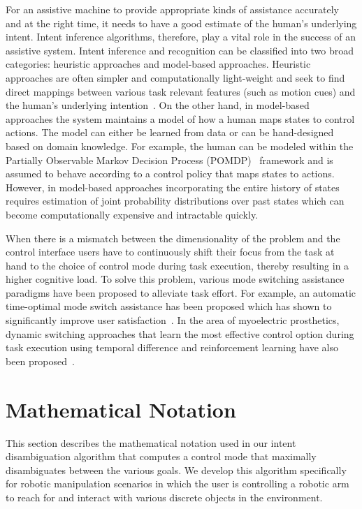 \documentclass[conference]{IEEEtran}
\begin{document}
For an assistive machine to provide appropriate kinds of assistance accurately and at the right time, it needs to have a good estimate of the human's underlying intent. Intent inference algorithms, therefore, play a vital role in the success of an assistive system. Intent inference and recognition can be classified into two broad categories: heuristic approaches and model-based approaches. Heuristic approaches are often simpler and computationally light-weight and seek to find direct mappings between various task relevant features (such as motion cues) and the human's underlying intention~\citep{baker2007goal, baker2009action}. On the other hand, in model-based approaches the system maintains a model of how a human maps states to control actions. The model can either be learned from data or can be hand-designed based on domain knowledge. For example, the human can be modeled within the Partially Observable Markov Decision Process (POMDP)~\citep{dragan2013policy, taha2011pomdp} framework and is assumed to behave according to a control policy that maps states to actions. However, in model-based approaches incorporating the entire history of states requires estimation of joint probability distributions over past states which can become computationally expensive and intractable quickly.

When there is a mismatch between the dimensionality of the problem and the control interface users have to continuously shift their focus from the task at hand to the choice of control mode during task execution, thereby resulting in a higher cognitive load. To solve this problem, various mode switching assistance paradigms have been proposed to alleviate task effort. For example, an automatic time-optimal mode switch assistance has been proposed which has shown to significantly improve user satisfaction~\citep{herlant2016assistive}. In the area of myoelectric prosthetics, dynamic switching approaches that learn the most effective control option during task execution using temporal difference and reinforcement learning have also been proposed~\cite{pilarski2012dynamic}. 


\section{Mathematical Notation}\label{sec:math}
This section describes the mathematical notation used in our intent disambiguation algorithm that computes a control mode that maximally disambiguates between the various goals.
We develop this algorithm specifically for robotic manipulation scenarios in which the user is controlling a robotic arm to reach for and interact with various discrete objects in the environment.
\end{document}
